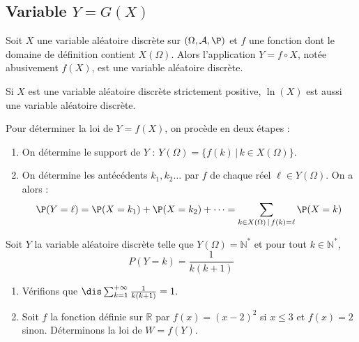 \documentclass[a4paper,10pt]{report}
\begin{document}
\newpage

\phantom{test}

\vspace{7cm}
\subsection{Variable $Y=G(X)$}
\begin{prop}
Soit $X$ une variable aléatoire discrète sur $(\Omega, \mathcal{A}, \P)$ et $f$ une fonction dont le domaine de définition contient $X(\Omega)$. Alors l'application $Y=f \circ X$, notée abusivement $f(X)$, est une variable aléatoire discrète.
\end{prop}

\begin{ex} Si $X$ est une variable aléatoire discrète strictement positive, $\ln(X)$ est aussi une variable aléatoire discrète.
\end{ex}

\medskip

\begin{metho}
Pour déterminer la loi de $Y=f(X)$, on procède en deux étapes : 
\begin{enumerate}
\item On détermine le support de $Y$ : $Y(\Omega) = \lbrace f(k) \, \vert \, k \in X(\Omega) \rbrace.$
\item  On détermine les antécédents $k_1,k_2\dots$ par $f$ de chaque réel $ \ell \in Y(\Omega)$. On a alors :  \[ \P(Y=\ell)=\P(X=k_1)+\P(X=k_2)+\cdots = \sum_{k \in X(\Omega) \, \vert \, f(k)= \ell} \P(X=k) \]
\end{enumerate}
\end{metho}


\begin{ex}\label{ex2.6}
Soit $Y$ la variable aléatoire discrète telle que $Y(\Omega) = \mathbb{N}^*$ et pour tout $k \in \mathbb{N}^*$,
\[ P(Y=k)= \frac{1}{k(k+1)} \]
\begin{enumerate}
\item Vérifions que $\dis \sum_{k=1}^{+ \infty} \frac{1}{k(k+1)} = 1$.

\vspace{3cm}

\item Soit $f$ la fonction définie sur $\mathbb{R}$ par $f(x) = (x-2)^2$ si $x \leq 3$ et $f(x)=2$ sinon. Déterminons la loi de $W=f(Y)$.

\vspace{3cm}
\end{enumerate}
\end{ex}
\end{document}
